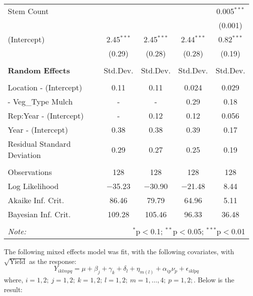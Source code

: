 \begin{table}[H]
\begin{tabular}{@{\extracolsep{5pt}}lccc|c}
 Stem Count &  &  &  & 0.005$^{***}$ \\ 
  &  &  &  & (0.001) \\ 
 (Intercept) & 2.45$^{***}$ & 2.45$^{***}$ & 2.44$^{***}$ & 0.82$^{***}$ \\ 
  & (0.29) & (0.28) & (0.28) & (0.19) \\ 
\hline\\[-1.8ex]
{\bf Random Effects} & Std.Dev. & Std.Dev. & Std.Dev. & Std.Dev.\\
\hline\\[-1.8ex]
Location - (Intercept) & 0.11 & 0.11 & 0.024 & 0.029\\
\hphantom{Location} - Veg\_Type Mulch &  -  &  -  & 0.29 & 0.18\\
Rep:Year - (Intercept) &  -  & 0.12 & 0.12 & 0.056\\
Year - (Intercept) & 0.38 & 0.38 & 0.39 & 0.17\\
Residual Standard Deviation & 0.29 & 0.27 & 0.25 & 0.19\\
\hline \\[-1.8ex] 
Observations & 128 & 128 & 128 & 128 \\ 
Log Likelihood & $-$35.23 & $-$30.90 & $-$21.48 & 8.44 \\ 
Akaike Inf. Crit. & 86.46 & 79.79 & 64.96 & 5.11 \\ 
Bayesian Inf. Crit. & 109.28 & 105.46 & 96.33 & 36.48 \\ 
\hline 
\hline \\[-1.8ex] 
\textit{Note:}  & \multicolumn{4}{r}{$^{*}$p$<$0.1; $^{**}$p$<$0.05; $^{***}$p$<$0.01} \\ 
\end{tabular} 
\end{table} 

The following mixed effects model was fit, with the following covariates, with $\sqrt{\text{Yield}}$ as the response:
\[ Y_{iklmpq} = \mu + \beta_j + \gamma_k + \delta_l + \eta_{m(l)} + \alpha_{ip}\nu_p +  \epsilon_{iklpq} \]
where, $i = 1,2; \ j = 1,2; \ k = 1, 2; \ l = 1,2; \ m = 1,\dots,4; \ p = 1, 2; $. Below is the result:

